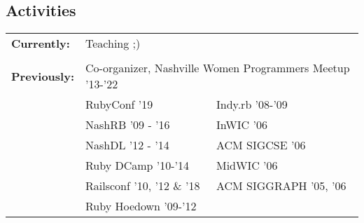 \documentclass[line, margin, 10pt]{res}
\begin{document}
\begin{resume}
\section{Activities}

\begin{tabular}[t]{@{} p{1.2in} p{1.9in} p{1.9in} @{}}
\bf{Currently:}

& \multicolumn{2}{p{3.8in}}{Teaching ;)} \\ %
\\
\bf{Previously:}
& \multicolumn{2}{p{3.8in}}{Co-organizer, Nashville Women Programmers Meetup '13-'22} \\
& RubyConf '19  & Indy.rb '08-'09  \\
& NashRB '09 - '16 &  InWIC '06\\
& NashDL '12 - '14 & ACM SIGCSE '06 \\
& Ruby DCamp '10-'14 & MidWIC '06   \\
& Railsconf '10, '12 \& '18 & ACM SIGGRAPH '05, '06 \\
& Ruby Hoedown '09-'12

\end{tabular}
\end{resume}
\end{document}
